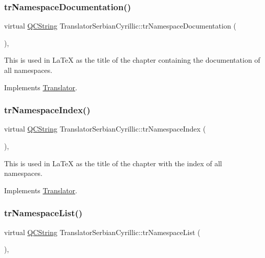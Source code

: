 \subsubsection{\texorpdfstring{trNamespaceDocumentation()}{trNamespaceDocumentation()}}
{\footnotesize\ttfamily virtual \mbox{\hyperlink{class_q_c_string}{Q\+C\+String}} Translator\+Serbian\+Cyrillic\+::tr\+Namespace\+Documentation (\begin{DoxyParamCaption}{ }\end{DoxyParamCaption})\hspace{0.3cm}{\ttfamily [inline]}, {\ttfamily [virtual]}}

This is used in La\+TeX as the title of the chapter containing the documentation of all namespaces. 

Implements \mbox{\hyperlink{class_translator}{Translator}}.

\mbox{\label{class_translator_serbian_cyrillic_a9369007351adee7d2b0b4e489c2e192c}} 
\subsubsection{\texorpdfstring{trNamespaceIndex()}{trNamespaceIndex()}}
{\footnotesize\ttfamily virtual \mbox{\hyperlink{class_q_c_string}{Q\+C\+String}} Translator\+Serbian\+Cyrillic\+::tr\+Namespace\+Index (\begin{DoxyParamCaption}{ }\end{DoxyParamCaption})\hspace{0.3cm}{\ttfamily [inline]}, {\ttfamily [virtual]}}

This is used in La\+TeX as the title of the chapter with the index of all namespaces. 

Implements \mbox{\hyperlink{class_translator}{Translator}}.

\mbox{\label{class_translator_serbian_cyrillic_a8e32fd986cedd63eb19cffc905019d31}} 
\subsubsection{\texorpdfstring{trNamespaceList()}{trNamespaceList()}}
{\footnotesize\ttfamily virtual \mbox{\hyperlink{class_q_c_string}{Q\+C\+String}} Translator\+Serbian\+Cyrillic\+::tr\+Namespace\+List (\begin{DoxyParamCaption}{ }\end{DoxyParamCaption})\hspace{0.3cm}{\ttfamily [inline]}, {\ttfamily [virtual]}}

